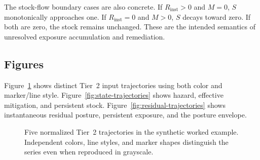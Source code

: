 \documentclass[11pt]{article}
\begin{document}
The stock-flow boundary cases are also concrete. If $R_{\mathrm{inst}}>0$ and $M=0$,
$S$ monotonically approaches one. If $R_{\mathrm{inst}}=0$ and $M>0$, $S$ decays toward
zero. If both are zero, the stock remains unchanged. These are the intended semantics
of unresolved exposure accumulation and remediation.

\subsection{Figures}
Figure~\ref{fig:tier2-trajectories} shows distinct Tier~2 input trajectories using both color and marker/line style. Figure~\ref{fig:state-trajectories}
shows hazard, effective mitigation, and persistent stock. Figure~\ref{fig:residual-trajectories}
shows instantaneous residual posture, persistent exposure, and the posture envelope.

\begin{figure}[htbp]
  \centering
  \caption{Five normalized Tier~2 trajectories in the synthetic worked example. Independent colors, line styles, and marker shapes distinguish the series even when reproduced in grayscale.}
  \label{fig:tier2-trajectories}
\end{figure}
\end{document}
